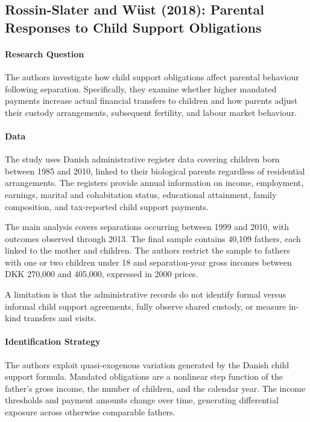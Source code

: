 \documentclass{article}
\begin{document}
\subsection{Rossin-Slater and Wüst (2018): Parental Responses to Child Support Obligations}

\paragraph{Research Question}
The authors investigate how child support obligations affect parental behaviour following separation. Specifically, they examine whether higher mandated payments increase actual financial transfers to children and how parents adjust their custody arrangements, subsequent fertility, and labour market behaviour.

\paragraph{Data}
The study uses Danish administrative register data covering children born between 1985 and 2010, linked to their biological parents regardless of residential arrangements. The registers provide annual information on income, employment, earnings, marital and cohabitation status, educational attainment, family composition, and tax-reported child support payments.

The main analysis covers separations occurring between 1999 and 2010, with outcomes observed through 2013. The final sample contains 40,109 fathers, each linked to the mother and children. The authors restrict the sample to fathers with one or two children under 18 and separation-year gross incomes between DKK 270,000 and 405,000, expressed in 2000 prices.

A limitation is that the administrative records do not identify formal versus informal child support agreements, fully observe shared custody, or measure in-kind transfers and visits.

\paragraph{Identification Strategy}
The authors exploit quasi-exogenous variation generated by the Danish child support formula. Mandated obligations are a nonlinear step function of the father's gross income, the number of children, and the calendar year. The income thresholds and payment amounts change over time, generating differential exposure across otherwise comparable fathers.
\end{document}
